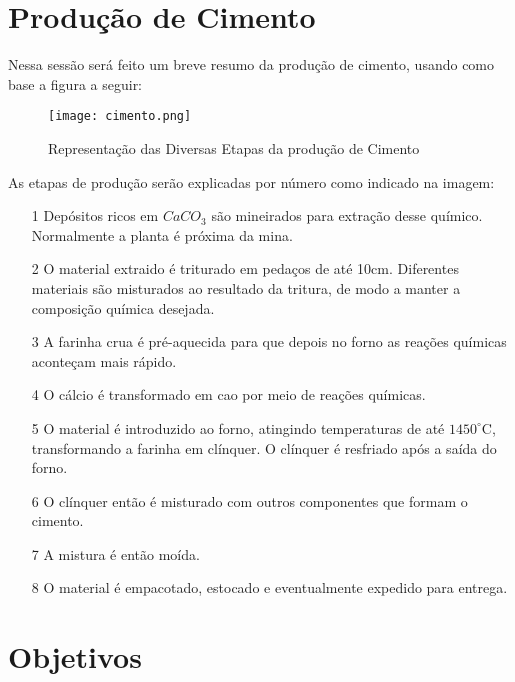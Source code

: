 \section{Produção de Cimento}
\label{sec:producao}

Nessa sessão será feito um breve resumo da produção de cimento, usando como base a figura a seguir: \\ 

\begin{figure}[H]
\centering
\texttt{[image: cimento.png]}
\caption{Representação das Diversas Etapas da produção de Cimento \citep{cementroadmap}}
\end{figure}


As etapas de produção serão explicadas por número como indicado na imagem: \\

\begin{itemize}

\item[1] Depósitos ricos em $CaCO_3$ são mineirados para extração desse químico. Normalmente a planta é próxima da mina.
\item[2] O material extraido é triturado em pedaços de até 10cm. Diferentes materiais são misturados ao resultado da tritura, de modo a manter a composição química desejada. 
\item[3] A farinha crua é pré-aquecida para que depois no forno as reações químicas aconteçam mais rápido. 
\item[4] O cálcio é transformado em cao por meio de reações químicas.  
\item[5] O material é introduzido ao forno, atingindo temperaturas de até $1450^\circ$C, transformando a farinha em clínquer. O clínquer é resfriado após a saída do forno. 
\item[6] O clínquer então é misturado com outros componentes que formam o cimento.
\item[7] A mistura é então moída.
\item[8] O material é empacotado, estocado e eventualmente expedido para entrega.

\end{itemize}


\section{Objetivos}
\label{sec:objetivo}


